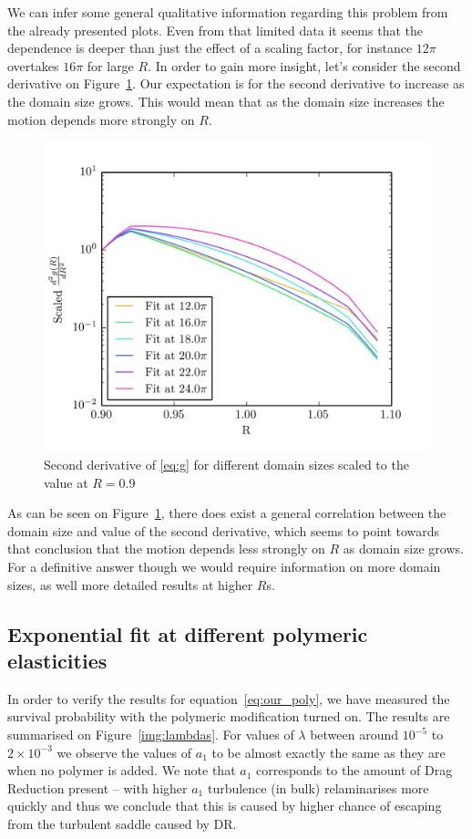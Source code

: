 \documentclass[11pt,a4paper]{article}
\begin{document}
We can infer some general qualitative information regarding this problem from the already presented plots.
Even from that limited data it seems that the dependence is deeper than just the effect of a scaling factor, for instance $12\pi$ overtakes $16\pi$ for large $R$.
In order to gain more insight, let's consider the second derivative on Figure~\ref{img:2der}.
Our expectation is for the second derivative to increase as the domain size grows.
This would mean that as the domain size increases the motion depends more strongly on $R$.

\begin{figure}[H]
    \centering
    \includegraphics[width=\textwidth]{scaled_fit}
    \caption{Second derivative of \eqref{eq:g} for different domain sizes scaled to the value at $R=0.9$}\label{img:2der}
\end{figure}

As can be seen on Figure~\ref{img:2der}, there does exist a general correlation between the domain size and value of the second derivative, which seems to point towards that conclusion that the motion depends less strongly on $R$ as domain size grows.
For a definitive answer though we would require information on more domain sizes, as well more detailed results at higher $R$s.

\subsection{Exponential fit at different polymeric elasticities}
In order to verify the results for equation~\eqref{eq:our_poly}, we have measured the survival probability  with the polymeric modification turned on.
The results are summarised on Figure~\ref{img:lambdas}.
For values of $\lambda$ between around $10^{-5}$ to $2\times 10^{-3}$ we observe the values of $a_1$ to be almost exactly the same as they are when no polymer is added.
We note that $a_1$ corresponds to the amount of Drag Reduction present -- with higher $a_1$ turbulence (in bulk) relaminarises more quickly and thus we conclude that this is caused by higher chance of escaping from the turbulent saddle caused by DR\cite{Graham04}.
\end{document}
